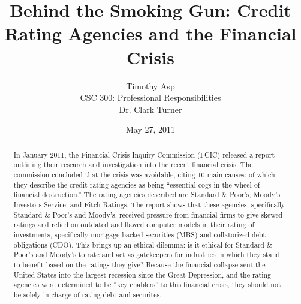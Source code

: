 \documentclass[11pt]{article}
\begin{document}
\title{\vfill Behind the Smoking Gun: Credit Rating Agencies and the Financial Crisis} %
\author{
Timothy Asp\vspace{10pt} \\
CSC 300: Professional Responsibilities\vspace{10pt} \\
Dr. Clark Turner\vspace{10pt} \\
}

\date{May 27, 2011}

\maketitle

\vfill
\begin{abstract}
In January 2011, the Financial Crisis Inquiry Commission (FCIC) released a report outlining their research and investigation into the recent financial crisis.  The commission concluded that the crisis was avoidable, citing 10 main causes: of which they describe the credit rating agencies as being ``essential cogs in the wheel of financial destruction.''\cite[p.~417-418]{govtReport}\cite[p.~xxv]{govtReport}  The rating agencies described are Standard \& Poor's, Moody's Investors Service, and Fitch Ratings.  The report shows that these agencies, specifically Standard \& Poor's and Moody's, received pressure from financial firms to give skewed ratings \cite{ratingEthics, hRatingEthics} and relied on outdated and flawed computer models in their rating of investments, specifically mortgage-backed securities (MBS) and collatorized debt obligations (CDO). \cite[p.~xxv]{govtReport}  This brings up an ethical dilemma: is it ethical for Standard \& Poor's and Moody's to rate and act as gatekeepers for industries in which they stand to benefit based on the ratings they give?  
Because the financial collapse sent the United States into the largest recession since the Great Depression, and the rating agencies were determined to be ``key enablers'' to this financial crisis, they should not be solely in-charge of rating debt and securites. 
\end{abstract}

\thispagestyle{empty} %
\newpage
\end{document}
